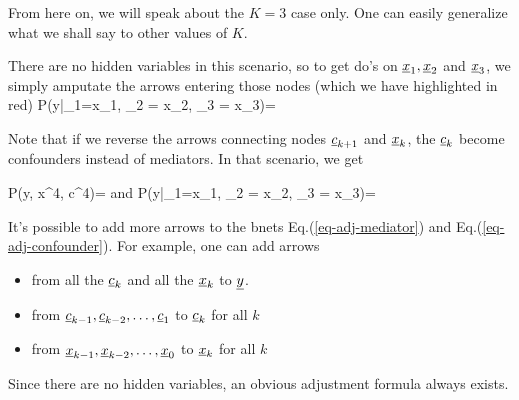 From here on, we will speak about the $K=3$ case only.
One can easily generalize what we shall 
say to other values of $K$.

There are no hidden variables in
this scenario, so to get do's on $\rvx_1, \rvx_2$ and $\rvx_3$,
we simply amputate the 
arrows entering those nodes (which
we have highlighted in red)
\beq
P(y|\cald \rvx_1=x_1,
\cald \rvx_2 = x_2,
\cald \rvx_3 = x_3)=
\bcen
{}\ecen
\eeq

Note that 
if we reverse the arrows 
connecting nodes $\rvc_{k+1}$ and $\rvx_k$,
the $\rvc_k$ become confounders
instead of mediators.
In that scenario, we get

\beq
P(y, x^4, c^4)=
\bcen
{}\ecen
\label{eq-adj-confounder}
\eeq
and
\beq
P(y|\cald \rvx_1=x_1,
\cald \rvx_2 = x_2,
\cald \rvx_3 = x_3)=
\bcen
{}\ecen
\eeq

It's possible to add more arrows to
the bnets Eq.(\ref{eq-adj-mediator})
and Eq.(\ref{eq-adj-confounder}).
For example, one can add arrows
\begin{itemize}
\item from all the $\rvc_k$ 
and all the $\rvx_k$ to $\rvy$.
\item
from  $\rvc_{k-1}, \rvc_{k-2}, \ldots, \rvc_1$ to $\rvc_k$ for all $k$
\item
from  $\rvx_{k-1}, \rvx_{k-2}, \ldots, \rvx_0$ to $\rvx_k$ for all $k$
\end{itemize}
Since there are no hidden variables,
an obvious adjustment formula always exists.



